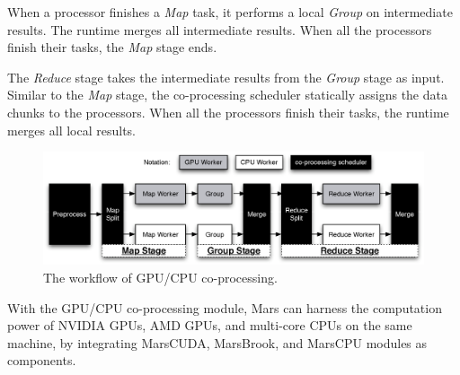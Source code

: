 When a processor finishes a {\em Map} task, it performs a local {\em Group} on intermediate results.
The runtime merges all intermediate results. When all the processors finish their
tasks, the {\em Map} stage ends.

The {\em Reduce} stage takes the intermediate results from the {\em Group} stage
as input. Similar to the {\em Map} stage, the co-processing scheduler statically assigns the
data chunks to the processors. When all the processors finish their
tasks, the runtime merges all local results.

\begin{figure}[h]
  \centering
  \includegraphics[width=1.00\textwidth]{figure/Mars+.eps} 
  \caption{The workflow of GPU/CPU co-processing. }\label{fig:Mars+}
\end{figure}

With the GPU/CPU co-processing module, Mars can harness the
computation power of NVIDIA GPUs, AMD GPUs, and multi-core CPUs on
the same machine, by integrating MarsCUDA, MarsBrook, and MarsCPU
modules as components.
